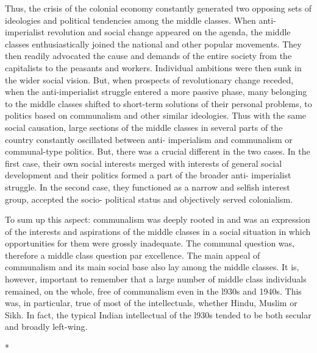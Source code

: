 Thus, the crisis of the colonial economy constantly generated two opposing sets of ideologies and political tendencies among the middle classes. When anti-imperialist revolution and social change appeared on the agenda, the middle classes enthusiastically joined the national and other popular movements. They then readily advocated the cause and demands of the entire society from the capitalists to the peasants and workers. Individual ambitions were then sunk in the wider social vision. But, when prospects of revolutionary change receded, when the anti-imperialist struggle entered a more passive phase, many belonging to the middle classes shifted to short-term solutions of their personal problems, to politics based on communalism and other similar ideologies. Thus with the same social causation, large sections of the middle classes in several parts of the country constantly oscillated between anti- imperialism and communalism or communal-type politics. But, there was a crucial different in the two cases. In the first case, their own social interests merged with interests of general social development and their politics formed a part of the broader anti- imperialist struggle. In the second case, they functioned as a narrow and selfish interest group, accepted the socio- political status and objectively served colonialism. 

To sum up this aspect: communalism was deeply rooted in and was an expression of the interests and aspirations of the middle classes in a social situation in which opportunities for them were grossly inadequate. The communal question was, therefore a middle class question par excellence. The main appeal of communalism and its main social base also lay among the middle classes. It is, however, important to remember that a large number of middle class individuals remained, on the whole, free of communalism even in the l930s and 1940s. This was, in particular, true of most of the intellectuals, whether Hindu, Muslim or Sikh. In fact, the typical Indian intellectual of the l930s tended to be both secular and broadly left-wing.

\begin{center}*\end{center}

\paragraph*{}


